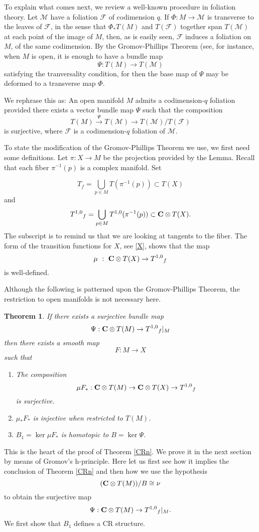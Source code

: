 \documentclass{amsart}
\newtheorem{theorem}{Theorem}[section]
\begin{document}
To  explain what comes next, we  review a well-known
procedure in foliation theory.  Let ${\mathcal{M}}$ have a foliation
${{\mathcal{F}}}$ of codimension $q$.  If 
$\Phi : M\to {\mathcal{M}}$ 
is transverse to the leaves of ${{\mathcal{F}}}$, in the sense that $\Phi_*T(M)$
and $T({{\mathcal{F}}})$ together span $T({\mathcal{M}})$ at each point of the image
of $M$, then, as is easily seen, ${{\mathcal{F}}}$ induces a foliation on $M$, of the same 
codimension.  By the Gromov-Phillips Theorem (see, for instance, \cite[Section 4, pp.~293--297]{Milnor} 
when $M$ is open, it is enough to have a bundle map
\[
\Psi : T(M) \to T({\mathcal{M}})
\]
satisfying the tranversality condition, for then the base map of
$\Psi$ may be deformed to a transverse map $\Phi$.  

We rephrase this as: An open manifold $M$ admits a codimension-$q$
foliation provided there exists a vector bundle map $\Psi$ such that the
composition
\[
T(M) \stackrel{\Psi}{\longrightarrow}T({\mathcal{M}})\longrightarrow 
T({\mathcal{M}}) /T({{\mathcal{F}}}) 
\]
is surjective, where ${{\mathcal{F}}}$ is a codimension-$q$ foliation of ${\mathcal{M}}$.  

To state the modification of the Gromov-Phillips Theorem we use, we
first need some definitions.   Let $\pi : X \to M$ be the projection provided by the Lemma.   
Recall that each fiber $\pi ^{-1}(p)$ is a complex manifold.  Set

\[
T_f =\bigcup _{p\in M}T (\pi ^{-1}(p))\subset T(X)
\]
and
\[
{T^{1,0}} _f =\bigcup _{p\in M}{T^{1,0}} (\pi ^{-1}(p))\subset {{\bf C}\otimes T(X)}.
\]
The subscript is to remind us that we are looking at tangents to the
fiber. The form of the transition functions for $X$, see \eqref{X}, 
shows that the map
\[
\mu \ :\ {{\bf C}\otimes T(X)}\to{T^{1,0}} _f
\]
is well-defined.

Although the following is patterned upon the Gromov-Phillips Theorem,
the restriction to open manifolds is not necessary here. 

\begin{theorem}\label{gromov}
If there exists a surjective bundle map 
\[
\Psi: {{\bf{C}}\otimes T(M)} \to {T^{1,0}} _f\vert _M 
\]
then there exists a smooth map
\[
F:M\to X
\]
such that

\begin{enumerate}
\item The composition 
\[
\mu F_* :{{\bf{C}}\otimes T(M)} \to {{\bf C}\otimes T(X)} \to {T^{1,0}} _f
\]
is surjective.
\item
$\mu _*F_*$ is injective when restricted to $T(M)$.
\item
$B_1= \ker \mu F_*$ is homotopic to $B= \ker \Psi $.
\end{enumerate}
\end{theorem}
This  is the heart of the proof of Theorem \ref{CRn}. We prove
it in the next section by means of Gromov's h-principle.  Here let us
first see how it implies the conclusion of Theorem \ref{CRn} and then how we use the hypothesis
\[
({{\bf{C}}\otimes T(M)} )/ B \cong \nu
\]
to obtain the surjective map
\[
\Psi: {{\bf{C}}\otimes T(M)} \to {T^{1,0}} _f\vert _M .
\]
We first show that $B_1$ defines a CR structure.
\end{document}
